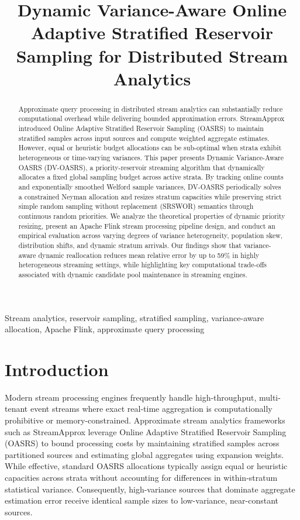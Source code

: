 \documentclass[conference]{IEEEtran}
\title{Dynamic Variance-Aware Online Adaptive Stratified Reservoir Sampling for Distributed Stream Analytics}
\author{\IEEEauthorblockN{Gauri Lekshmi Sathya}
\IEEEauthorblockA{2023BCS0034}
\and
\IEEEauthorblockN{Abhinav VS}
\IEEEauthorblockA{2023BCS0181}
\and
\IEEEauthorblockN{Arjun Manjunath}
\IEEEauthorblockA{2023BCD0067}}
\begin{document}
\maketitle
\thispagestyle{plain}

\begin{abstract}
Approximate query processing in distributed stream analytics can substantially reduce computational overhead while delivering bounded approximation errors. StreamApprox introduced Online Adaptive Stratified Reservoir Sampling (OASRS) to maintain stratified samples across input sources and compute weighted aggregate estimates. However, equal or heuristic budget allocations can be sub-optimal when strata exhibit heterogeneous or time-varying variances. This paper presents Dynamic Variance-Aware OASRS (DV-OASRS), a priority-reservoir streaming algorithm that dynamically allocates a fixed global sampling budget across active strata. By tracking online counts and exponentially smoothed Welford sample variances, DV-OASRS periodically solves a constrained Neyman allocation and resizes stratum capacities while preserving strict simple random sampling without replacement (SRSWOR) semantics through continuous random priorities. We analyze the theoretical properties of dynamic priority resizing, present an Apache Flink stream processing pipeline design, and conduct an empirical evaluation across varying degrees of variance heterogeneity, population skew, distribution shifts, and dynamic stratum arrivals. Our findings show that variance-aware dynamic reallocation reduces mean relative error by up to 59\% in highly heterogeneous streaming settings, while highlighting key computational trade-offs associated with dynamic candidate pool maintenance in streaming engines.
\end{abstract}

\begin{IEEEkeywords}
Stream analytics, reservoir sampling, stratified sampling, variance-aware allocation, Apache Flink, approximate query processing
\end{IEEEkeywords}

\section{Introduction}

Modern stream processing engines frequently handle high-throughput, multi-tenant event streams where exact real-time aggregation is computationally prohibitive or memory-constrained. Approximate stream analytics frameworks such as StreamApprox leverage Online Adaptive Stratified Reservoir Sampling (OASRS) to bound processing costs by maintaining stratified samples across partitioned sources and estimating global aggregates using expansion weights. While effective, standard OASRS allocations typically assign equal or heuristic capacities across strata without accounting for differences in within-stratum statistical variance. Consequently, high-variance sources that dominate aggregate estimation error receive identical sample sizes to low-variance, near-constant sources.
\end{document}
